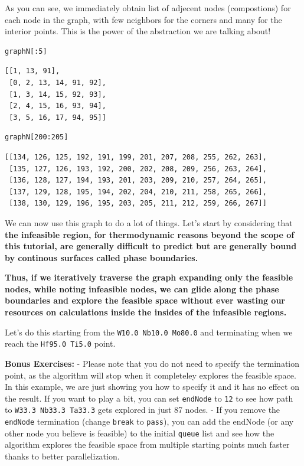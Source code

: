 As you can see, we immediately obtain list of adjecent nodes
(compostions) for each node in the graph, with few neighbors for the
corners and many for the interior points. This is the power of the
abstraction we are talking about!

\begin{verbatim}
graphN[:5]
\end{verbatim}

\begin{verbatim}
[[1, 13, 91],
 [0, 2, 13, 14, 91, 92],
 [1, 3, 14, 15, 92, 93],
 [2, 4, 15, 16, 93, 94],
 [3, 5, 16, 17, 94, 95]]
\end{verbatim}

\begin{verbatim}
graphN[200:205]
\end{verbatim}

\begin{verbatim}
[[134, 126, 125, 192, 191, 199, 201, 207, 208, 255, 262, 263],
 [135, 127, 126, 193, 192, 200, 202, 208, 209, 256, 263, 264],
 [136, 128, 127, 194, 193, 201, 203, 209, 210, 257, 264, 265],
 [137, 129, 128, 195, 194, 202, 204, 210, 211, 258, 265, 266],
 [138, 130, 129, 196, 195, 203, 205, 211, 212, 259, 266, 267]]
\end{verbatim}

We can now use this graph to do a lot of things. Let's start by
considering that \textbf{the infeasible region, for thermodynamic
reasons beyond the scope of this tutorial, are generally difficult to
predict but are generally bound by continous surfaces called phase
boundaries.}

\textbf{Thus, if we iteratively traverse the graph expanding only the
feasible nodes, while noting infeasible nodes, we can glide along the
phase boundaries and explore the feasible space without ever wasting our
resources on calculations inside the insides of the infeasible regions.}

Let's do this starting from the
\texttt{W10.0 Nb10.0 Mo80.0} and terminating when we
reach the \texttt{Hf95.0 Ti5.0} point.

\textbf{Bonus Exercises:} - Please note that you do not need to specify
the termination point, as the algorithm will stop when it completeley
explores the feasible space. In this example, we are just showing you
how to specify it and it has no effect on the result. If you want to
play a bit, you can set \texttt{endNode} to
\texttt{12} to see how path to
\texttt{W33.3 Nb33.3 Ta33.3} gets explored in just 87
nodes. - If you remove the \texttt{endNode} termination
(change \texttt{break} to
\texttt{pass}), you can add the endNode (or any other
node you believe is feasible) to the initial
\texttt{queue} list and see how the algorithm explores
the feasible space from multiple starting points much faster thanks to
better parallelization.

